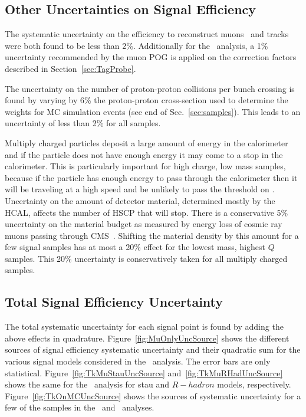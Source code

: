 
\subsection{Other Uncertainties on Signal Efficiency}

The systematic uncertainty on the efficiency to reconstruct muons~\cite{2012JInst...7P0002T} and tracks~\cite{CMS:2010mua} were both found to be less than 2\%.
Additionally for the \muononly\ analysis, a 1\% uncertainty recommended by the muon POG is applied on the correction factors described in Section~\ref{sec:TagProbe}.

The uncertainty on the number of proton-proton collisions per bunch crossing is found by varying by 6\% the 
proton-proton cross-section used to determine the weights for MC simulation events (see end of Sec.~\ref{sec:samples}).
This leads to an uncertainty of less than 2\% for all samples.

Multiply charged particles deposit a large amount of energy in the calorimeter and if the particle does not have enough energy it may come to a stop in the calorimeter.
This is particularly important for high charge, low mass samples, because if the particle has enough energy to pass through the calorimeter then it will
be traveling at a high speed and be unlikely to pass the threshold on \invbeta. Uncertainty on the amount of detector material, determined mostly by the
HCAL, affects the number of HSCP that will stop. There is a conservative 5\% uncertainty on the material budget as measured by energy loss of cosmic ray muons
passing through CMS~\cite{Chatrchyan:2009si}. Shifting the material density by this amount for a few signal samples has at most a 20\% effect
for the lowest mass, highest $Q$ samples. This 20\% uncertainty is conservatively taken for all multiply charged samples.

\subsection{Total Signal Efficiency Uncertainty}

The total systematic uncertainty for each signal point is found by adding the above effects in quadrature.
Figure~\ref{fig:MuOnlyUncSource} shows the different sources of signal efficiency systematic uncertainty and their quadratic sum
for the various signal models considered in the \muononly\ analysis. The error bars are only statistical.
Figure~\ref{fig:TkMuStauUncSource} and~\ref{fig:TkMuRHadUncSource} shows the same for the \tktof\ analysis for stau and $R-hadron$ models, respectively.
Figure~\ref{fig:TkOnMCUncSource} shows the sources of systematic uncertainty for a few of the samples in the \tkonly\ and \multi\ analyses.

